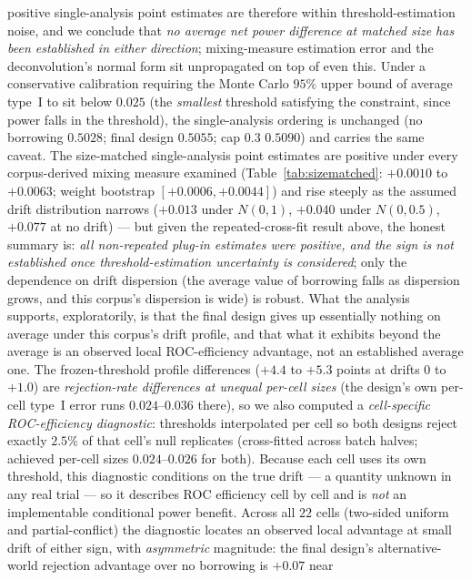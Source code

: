 \documentclass[11pt]{article}
\begin{document}
positive single-analysis point estimates are therefore within
threshold-estimation noise, and we conclude that \emph{no average net
power difference at matched size has been established in either
direction}; mixing-measure estimation error and the deconvolution's
normal form sit unpropagated on top of even this. Under a conservative
calibration requiring the Monte Carlo $95\%$ upper bound of average
type~I to sit below $0.025$ (the \emph{smallest} threshold satisfying the
constraint, since power falls in the threshold), the single-analysis
ordering is unchanged (no borrowing
$0.5028$; final design $0.5055$; cap $0.3$ $0.5090$) and carries the same
caveat. The size-matched
single-analysis point estimates are positive under every corpus-derived
mixing measure examined
(Table~\ref{tab:sizematched}: $+0.0010$ to $+0.0063$; weight bootstrap
$[+0.0006, +0.0044]$) and rise steeply as the assumed
drift distribution narrows ($+0.013$ under $N(0,1)$, $+0.040$ under
$N(0,0.5)$, $+0.077$ at no drift) --- but given the repeated-cross-fit
result above, the honest summary is: \emph{all non-repeated plug-in
estimates were positive, and the sign is not established once
threshold-estimation
uncertainty is considered}; only the dependence on drift dispersion (the
average value of borrowing falls as dispersion grows, and this corpus's
dispersion is wide) is robust. What the analysis supports,
exploratorily, is that the final design gives up essentially nothing on
average under this corpus's drift profile, and that what it exhibits
beyond the average is an observed local ROC-efficiency advantage, not an
established average one. The frozen-threshold profile differences
($+4.4$ to $+5.3$ points at drifts $0$ to $+1.0$) are \emph{rejection-rate
differences at unequal per-cell sizes} (the design's own per-cell type~I
error runs $0.024$--$0.036$ there), so we also computed a
\emph{cell-specific ROC-efficiency diagnostic}: thresholds interpolated
per cell so both designs reject exactly
$2.5\%$ of that cell's null replicates (cross-fitted across batch halves;
achieved per-cell sizes $0.024$--$0.026$ for both). Because each cell
uses its own threshold, this diagnostic conditions on the true drift ---
a quantity unknown in any real trial --- so it describes ROC efficiency
cell by cell and is \emph{not} an implementable conditional power
benefit. Across all $22$ cells (two-sided uniform and partial-conflict)
the diagnostic locates an observed local advantage at small drift of
either sign, with \emph{asymmetric} magnitude: the final design's
alternative-world rejection advantage over no borrowing is $+0.07$ near
\end{document}
